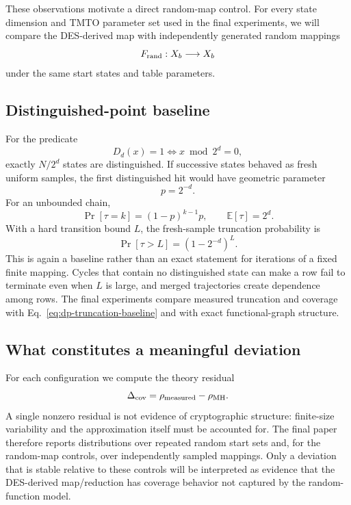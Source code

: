 These observations motivate a direct random-map control.  For every state
dimension and TMTO parameter set used in the final experiments, we will compare
the DES-derived map with independently generated random mappings
\[
    F_{\rm rand}:X_b\longrightarrow X_b
\]
under the same start states and table parameters.

\subsection{Distinguished-point baseline}

For the predicate
\[
    D_d(x)=1
    \Longleftrightarrow
    x\bmod2^d=0,
\]
exactly $N/2^d$ states are distinguished.  If successive states behaved as
fresh uniform samples, the first distinguished hit would have geometric
parameter
\[
    p=2^{-d}.
\]
For an unbounded chain,
\[
    \Pr[\tau=k]=(1-p)^{k-1}p,
    \qquad
    \mathbb E[\tau]=2^d.
\]
With a hard transition bound $L$, the fresh-sample truncation probability is
\begin{equation}
    \Pr[\tau>L]
      =
      (1-2^{-d})^L.
    \label{eq:dp-truncation-baseline}
\end{equation}
This is again a baseline rather than an exact statement for iterations of a
fixed finite mapping.  Cycles that contain no distinguished state can make a
row fail to terminate even when $L$ is large, and merged trajectories create
dependence among rows.  The final experiments compare measured truncation and
coverage with Eq.~\eqref{eq:dp-truncation-baseline} and with exact
functional-graph structure.

\subsection{What constitutes a meaningful deviation}

For each configuration we compute the theory residual
\[
    \Delta_{\rm cov}
      =
      \rho_{\rm measured}-\rho_{\rm MH}.
\]
A single nonzero residual is not evidence of cryptographic structure:
finite-size variability and the approximation itself must be accounted for.
The final paper therefore reports distributions over repeated random start
sets and, for the random-map controls, over independently sampled mappings.
Only a deviation that is stable relative to these controls will be interpreted
as evidence that the DES-derived map/reduction has coverage behavior not
captured by the random-function model.

